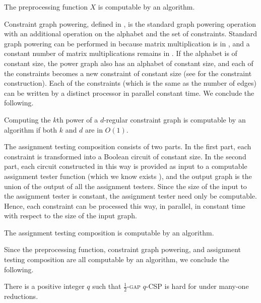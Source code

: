 \documentclass{article}
\begin{document}
\begin{lemma}
  The preprocessing function $X$ is computable by an \NC{} algorithm.
\end{lemma}

Constraint graph powering, defined in \cite[Section~1.2]{dinur07}, is the standard graph powering operation with an additional operation on the alphabet and the set of constraints.
Standard graph powering can be performed in \NC{} because matrix multiplication is in \NC{}, and a constant number of matrix multiplications remains in \NC{}.
If the alphabet is of constant size, the power graph also has an alphabet of constant size, and each of the constraints becomes a new constraint of constant size (see \cite[Section~1.2]{dinur07} for the constraint construction).
Each of the constraints (which is the same as the number of edges) can be written by a distinct processor in parallel constant time.
We conclude the following.

\begin{lemma}
  Computing the $k$th power of a $d$-regular constraint graph is computable by an \NC{} algorithm if both $k$ and $d$ are in $O(1)$.
\end{lemma}

The assignment testing composition \cite[Definition~5.1]{dinur07} consists of two parts.
In the first part, each constraint is transformed into a Boolean circuit of constant size.
In the second part, each circuit constructed in this way is provided as input to a computable assignment tester function (which we know exists \cite[Theorem~5.1]{dinur07}), and the output graph is the union of the output of all the assignment testers.
Since the size of the input to the assignment tester is constant, the assignment tester need only be computable.
Hence, each constraint can be processed this way, in parallel, in constant time with respect to the size of the input graph.

\begin{lemma}
  The assignment testing composition is computable by an \NC{} algorithm.
\end{lemma}

Since the preprocessing function, constraint graph powering, and assignment testing composition are all computable by an \NC{} algorithm, we conclude the following.

\begin{lemma}\label{lem:reduction}
  There is a positive integer $q$ such that \textsc{$\frac{1}{2}$-gap $q$-CSP} is hard for \NP{} under \NC{} many-one reductions.
\end{lemma}
\end{document}
